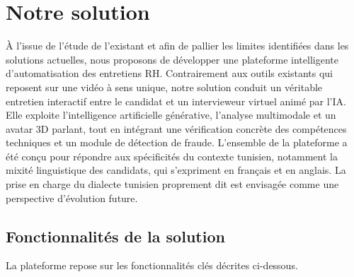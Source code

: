 \section{Notre solution}

À l’issue de l’étude de l’existant et afin de pallier les limites identifiées dans les solutions actuelles, nous proposons de développer une plateforme intelligente d’automatisation des entretiens RH. Contrairement aux outils existants qui reposent sur une vidéo à sens unique, notre solution conduit un véritable entretien interactif entre le candidat et un intervieweur virtuel animé par l’IA. Elle exploite l’intelligence artificielle générative, l’analyse multimodale et un avatar 3D parlant, tout en intégrant une vérification concrète des compétences techniques et un module de détection de fraude. L’ensemble de la plateforme a été conçu pour répondre aux spécificités du contexte tunisien, notamment la mixité linguistique des candidats, qui s’expriment en français et en anglais. La prise en charge du dialecte tunisien proprement dit est envisagée comme une perspective d’évolution future.

\subsection{Fonctionnalités de la solution}

La plateforme repose sur les fonctionnalités clés décrites ci-dessous.

